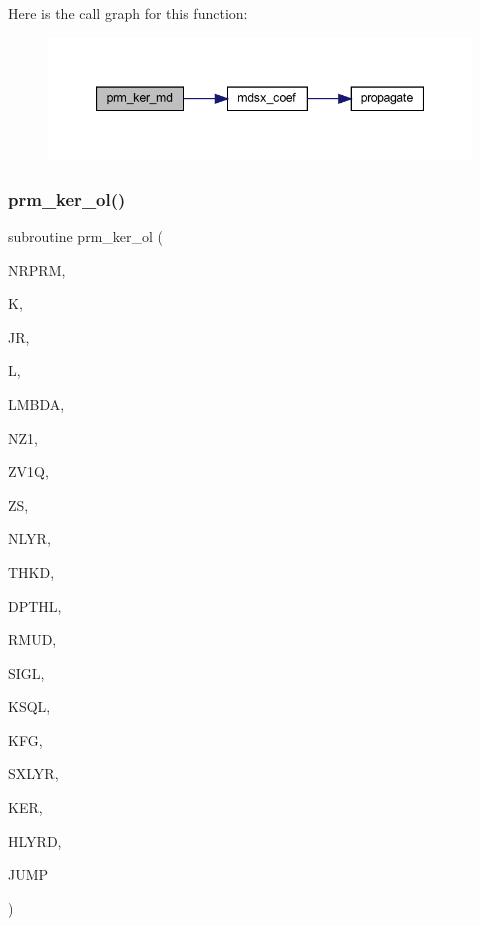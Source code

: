 Here is the call graph for this function\+:\nopagebreak
\begin{figure}[H]
\begin{center}
\leavevmode
\includegraphics[width=347pt]{Leroi__c_8f90_a54994b19439ad9ea5bfc96a902101c44_cgraph}
\end{center}
\end{figure}
\mbox{\label{Leroi__c_8f90_a5a775b5fbe7ca4b27ec968d5efde2795}} 
\subsubsection{\texorpdfstring{prm\+\_\+ker\+\_\+ol()}{prm\_ker\_ol()}}
{\footnotesize\ttfamily subroutine prm\+\_\+ker\+\_\+ol (\begin{DoxyParamCaption}\item[{integer}]{N\+R\+P\+RM,  }\item[{integer}]{K,  }\item[{integer}]{JR,  }\item[{integer}]{L,  }\item[{real(kind=ql)}]{L\+M\+B\+DA,  }\item[{integer}]{N\+Z1,  }\item[{real(kind=ql), dimension(nz1)}]{Z\+V1Q,  }\item[{real(kind=ql)}]{ZS,  }\item[{integer}]{N\+L\+YR,  }\item[{real(kind=ql), dimension (nlyr)}]{T\+H\+KD,  }\item[{real(kind=ql), dimension (nlyr)}]{D\+P\+T\+HL,  }\item[{real(kind=ql), dimension(0\+:nlyr)}]{R\+M\+UD,  }\item[{complex(kind=ql), dimension (nlyr)}]{S\+I\+GL,  }\item[{complex(kind=ql), dimension (nlyr)}]{K\+S\+QL,  }\item[{integer}]{K\+FG,  }\item[{integer}]{S\+X\+L\+YR,  }\item[{complex (kind=ql), dimension(jnlo-\/nrprm\+:jnhi,3,nz1)}]{K\+ER,  }\item[{complex (kind=ql), dimension(nrprm,3,nz1)}]{H\+L\+Y\+RD,  }\item[{logical}]{J\+U\+MP }\end{DoxyParamCaption})}

